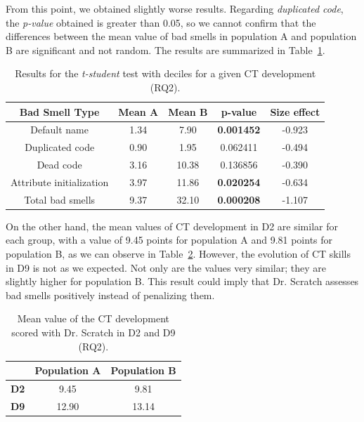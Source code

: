 From this point, we obtained slightly worse results. Regarding \textit{duplicated code}, the \textit{p-value} obtained is greater than 0.05, so we cannot confirm that the differences between the mean value of bad smells in population A and population B are significant and not random.  The results are summarized in Table~\ref{table:rq2_statistical_results}.

\begin{table}
 \begin{center}
  \begin{tabular}{|c|c|c|c|c|}
    \hline
    \textbf{Bad Smell Type} & \textbf{Mean A} & \textbf{Mean B} & \textbf{p-value} & \textbf{Size effect} \\ \hline
    Default name & 1.34 & 7.90 & \textbf{0.001452} & -0.923 \\ \hline
    Duplicated code & 0.90 & 1.95 & 0.062411 & -0.494 \\ \hline
    Dead code & 3.16 & 10.38 & 0.136856 & -0.390 \\ \hline
    Attribute initialization & 3.97 & 11.86 & \textbf{0.020254} & -0.634 \\ \hline
    Total bad smells & 9.37 & 32.10 & \textbf{0.000208} & -1.107 \\ \hline
  \end{tabular}
  \caption{Results for the \textit{t-student} test with deciles for a given CT development (RQ2).}
  \label{table:rq2_statistical_results}
 \end{center}
\end{table}

On the other hand, the mean values of CT development in D2 are similar for each group, with a value of 9.45 points for population A and 9.81 points for population B, as we can observe in Table~\ref{table:rq2_statistical_results_mean}. However, the evolution of CT skills in D9 is not as we expected. Not only are the values very similar; they are slightly higher for population B. This result could imply that Dr. Scratch assesses bad smells positively instead of penalizing them.

\begin{table}
 \begin{center}
  \begin{tabular}{|c|c|c|}
    \hline
     & \textbf{Population A} & \textbf{Population B} \\ \hline
    \textbf{D2} & 9.45 & 9.81 \\ \hline
    \textbf{D9} & 12.90 & 13.14 \\ \hline
  \end{tabular}
  \caption{Mean value of the CT development scored with Dr. Scratch in D2 and D9 (RQ2).}
  \label{table:rq2_statistical_results_mean}
 \end{center}
\end{table}


